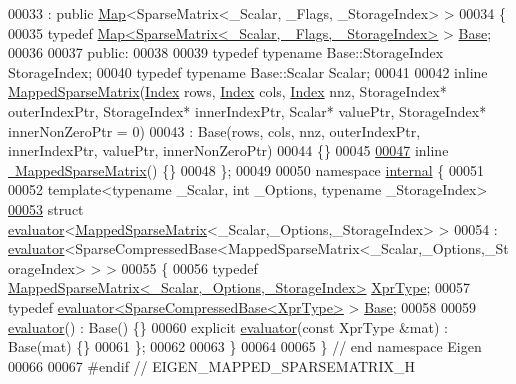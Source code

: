 \begin{DoxyCode}
00033   : \textcolor{keyword}{public} \hyperlink{group___core___module_class_eigen_1_1_map}{Map}<SparseMatrix<\_Scalar, \_Flags, \_StorageIndex> >
00034 \{
00035     \textcolor{keyword}{typedef} \hyperlink{group___core___module_class_eigen_1_1_map}{Map<SparseMatrix<\_Scalar, \_Flags, \_StorageIndex>}
       > \hyperlink{group___core___module}{Base};
00036 
00037   \textcolor{keyword}{public}:
00038     
00039     \textcolor{keyword}{typedef} \textcolor{keyword}{typename} Base::StorageIndex StorageIndex;
00040     \textcolor{keyword}{typedef} \textcolor{keyword}{typename} Base::Scalar Scalar;
00041 
00042     \textcolor{keyword}{inline} \hyperlink{class_eigen_1_1_mapped_sparse_matrix}{MappedSparseMatrix}(\hyperlink{namespace_eigen_a62e77e0933482dafde8fe197d9a2cfde}{Index} rows, \hyperlink{namespace_eigen_a62e77e0933482dafde8fe197d9a2cfde}{Index} cols, 
      \hyperlink{namespace_eigen_a62e77e0933482dafde8fe197d9a2cfde}{Index} nnz, StorageIndex* outerIndexPtr, StorageIndex* innerIndexPtr, Scalar* valuePtr, StorageIndex* 
      innerNonZeroPtr = 0)
00043       : Base(rows, cols, nnz, outerIndexPtr, innerIndexPtr, valuePtr, innerNonZeroPtr)
00044     \{\}
00045 
\hyperlink{class_eigen_1_1_mapped_sparse_matrix_a0c36a53853f1659ea59447bcb9a20799}{00047}     \textcolor{keyword}{inline} \hyperlink{class_eigen_1_1_mapped_sparse_matrix_a0c36a53853f1659ea59447bcb9a20799}{~MappedSparseMatrix}() \{\}
00048 \};
00049 
00050 \textcolor{keyword}{namespace }\hyperlink{namespaceinternal}{internal} \{
00051 
00052 \textcolor{keyword}{template}<\textcolor{keyword}{typename} \_Scalar, \textcolor{keywordtype}{int} \_Options, \textcolor{keyword}{typename} \_StorageIndex>
\hyperlink{struct_eigen_1_1internal_1_1evaluator_3_01_mapped_sparse_matrix_3_01___scalar_00_01___options_00_01___storage_index_01_4_01_4}{00053} \textcolor{keyword}{struct }\hyperlink{struct_eigen_1_1internal_1_1evaluator}{evaluator}<\hyperlink{class_eigen_1_1_mapped_sparse_matrix}{MappedSparseMatrix}<\_Scalar,\_Options,\_StorageIndex> >
00054   : \hyperlink{struct_eigen_1_1internal_1_1evaluator}{evaluator}<SparseCompressedBase<MappedSparseMatrix<\_Scalar,\_Options,\_StorageIndex> > >
00055 \{
00056   \textcolor{keyword}{typedef} \hyperlink{class_eigen_1_1_mapped_sparse_matrix}{MappedSparseMatrix<\_Scalar,\_Options,\_StorageIndex>}
       \hyperlink{class_eigen_1_1_mapped_sparse_matrix}{XprType};
00057   \textcolor{keyword}{typedef} \hyperlink{struct_eigen_1_1internal_1_1evaluator}{evaluator<SparseCompressedBase<XprType>} > 
      \hyperlink{struct_eigen_1_1internal_1_1evaluator}{Base};
00058   
00059   \hyperlink{struct_eigen_1_1internal_1_1evaluator}{evaluator}() : Base() \{\}
00060   \textcolor{keyword}{explicit} \hyperlink{struct_eigen_1_1internal_1_1evaluator}{evaluator}(\textcolor{keyword}{const} XprType &mat) : Base(mat) \{\}
00061 \};
00062 
00063 \}
00064 
00065 \} \textcolor{comment}{// end namespace Eigen}
00066 
00067 \textcolor{preprocessor}{#endif // EIGEN\_MAPPED\_SPARSEMATRIX\_H}
\end{DoxyCode}
